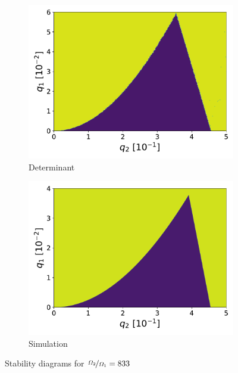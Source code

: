 \begin{figure}[H]
\begin{subfigure}{.5\textwidth}
  \centering
  \includegraphics[width=\linewidth]{img/det_q1_0.0-0.06_q2_0.0-0.5_300x300_833.pdf}
  \caption{Determinant}
  \label{fig:det_833}
\end{subfigure}%
\begin{subfigure}{.5\textwidth}
  \centering
  \includegraphics[width=\linewidth]{img/0_ions_1_electrons_q1_0.0-0.04_q2_0.0-0.5_897x897_833.pdf}  
  \caption{Simulation}
  \label{fig:sim_833}
\end{subfigure}
\caption{Stability diagrams for $\nicefrac{\Omega_2}{\Omega_1} = 833$}
\label{fig:stabil-eta=833}
\end{figure}


